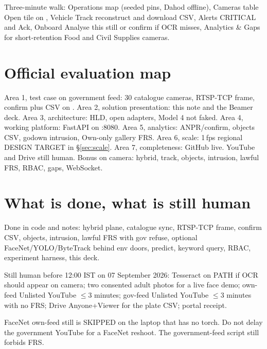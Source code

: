 \documentclass[listings]{csf301-notes}
\begin{document}
Three-minute walk: Operations map (seeded pins, Dahod offline), Cameras table Open tile on , Vehicle Track reconstruct  and download CSV, Alerts CRITICAL and Ack, Onboard Analyse this still or confirm if OCR misses, Analytics \& Gaps for short-retention Food and Civil Supplies cameras.

\section{Official evaluation map}
Area 1, test case on government feed: 30 catalogue cameras, RTSP-TCP frame, confirm plus CSV on . Area 2, solution presentation: this note and the Beamer deck. Area 3, architecture: HLD, open adapters, Model 4 not faked. Area 4, working platform: FastAPI on :8080. Area 5, analytics: ANPR/confirm, objects CSV, godown intrusion, Own-only gallery FRS. Area 6, scale: 1\,fps regional DESIGN TARGET in \S\ref{sec:scale}. Area 7, completeness: GitHub live. YouTube and Drive still human. Bonus on camera: hybrid, track, objects, intrusion, lawful FRS, RBAC, gaps, WebSocket.

\section{What is done, what is still human}
Done in code and notes: hybrid plane, catalogue sync, RTSP-TCP frame, confirm CSV, objects, intrusion, lawful FRS with gov refuse, optional FaceNet/YOLO/ByteTrack behind env doors, predict, keyword query, RBAC, experiment harness, this deck.

Still human before 12:00 IST on 07 September 2026: Tesseract on PATH if OCR should appear on camera; two consented adult photos for a live face demo; own-feed Unlisted YouTube $\le 3$ minutes; gov-feed Unlisted YouTube $\le 3$ minutes with no FRS; Drive Anyone+Viewer for the plate CSV; portal receipt.

FaceNet own-feed still is SKIPPED on the laptop that has no torch. Do not delay the government YouTube for a FaceNet reshoot. The government-feed script still forbids FRS.
\end{document}
